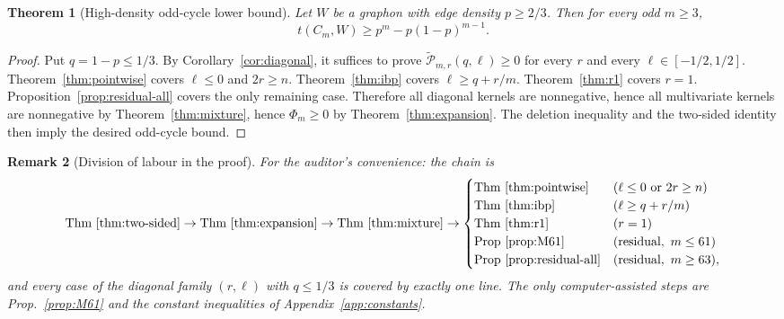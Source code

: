 \documentclass[11pt]{article}
\newtheorem{theorem}{Theorem}[section]
\newtheorem{remark}[theorem]{Remark}
\newcommand{\wtP}{\widetilde{\mathcal P}}
\begin{document}
\begin{theorem}[High-density odd-cycle lower bound]\label{thm:regionI-full}
Let $W$ be a graphon with edge density $p\ge2/3$.  Then for every odd $m\ge3$,
\[
        t(C_m,W)\ge p^m-p(1-p)^{m-1}.
\]
\end{theorem}

\begin{proof}
Put $q=1-p\le1/3$.  By Corollary~\ref{cor:diagonal}, it suffices to prove $\wtP_{m,r}(q,\ell)\ge0$ for every $r$ and every $\ell\in[-1/2,1/2]$.  Theorem~\ref{thm:pointwise} covers $\ell\le0$ and $2r\ge n$.  Theorem~\ref{thm:ibp} covers $\ell\ge q+r/m$.  Theorem~\ref{thm:r1} covers $r=1$.  Proposition~\ref{prop:residual-all} covers the only remaining case.  Therefore all diagonal kernels are nonnegative, hence all multivariate kernels are nonnegative by Theorem~\ref{thm:mixture}, hence $\Phi_m\ge0$ by Theorem~\ref{thm:expansion}.  The deletion inequality and the two-sided identity then imply the desired odd-cycle bound.
\end{proof}

\begin{remark}[Division of labour in the proof]\label{rmk:division}
For the auditor's convenience: the chain is
\[
\text{Thm}~\ref{thm:two-sided}
\to\text{Thm}~\ref{thm:expansion}
\to\text{Thm}~\ref{thm:mixture}
\to
\begin{cases}
\text{Thm}~\ref{thm:pointwise} & (\ell\le0\ \text{or}\ 2r\ge n)\\
\text{Thm}~\ref{thm:ibp} & (\ell\ge q+r/m)\\
\text{Thm}~\ref{thm:r1} & (r=1)\\
\text{Prop}~\ref{prop:M61} & (\text{residual},\ m\le61)\\
\text{Prop}~\ref{prop:residual-all} & (\text{residual},\ m\ge63),
\end{cases}
\]
and every case of the diagonal family $(r,\ell)$ with $q\le1/3$ is covered by
exactly one line.  The only computer-assisted steps are
Prop.~\ref{prop:M61} and the constant inequalities of
Appendix~\ref{app:constants}.
\end{remark}
\end{document}
